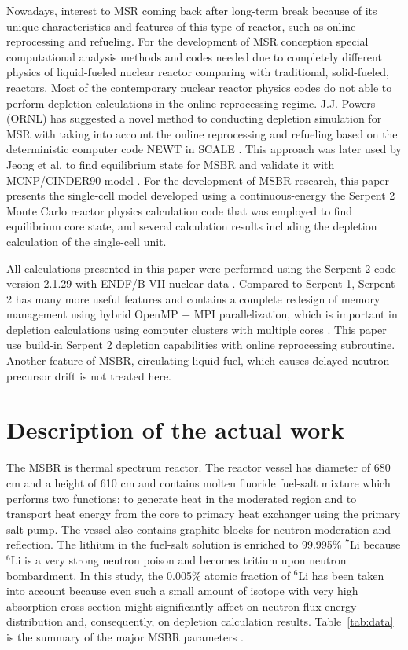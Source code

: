 \documentclass{anstrans}
\begin{document}
Nowadays, interest to \gls{MSR} coming back after long-term break because of its unique characteristics and features of this type of reactor, such as online reprocessing and refueling. For the development of \gls{MSR} conception special computational analysis methods and codes needed due to completely different physics of liquid-fueled nuclear reactor comparing with traditional, solid-fueled, reactors. Most of the contemporary nuclear reactor physics codes do not able to perform depletion calculations in the online reprocessing regime. J.J. Powers (\gls{ORNL}) has suggested a novel method to conducting depletion simulation for \gls{MSR} with taking into account the online reprocessing and refueling based on the deterministic computer code NEWT in SCALE \cite{powers_new_2013}. This approach was later used by Jeong et al. to find equilibrium state for \gls{MSBR} and validate it with \gls{MCNP}/CINDER90 model \cite{jeong_equilibrium_2016}. For the development of \gls{MSBR} research, this paper presents the single-cell model developed using a continuous-energy the Serpent 2 Monte Carlo reactor physics calculation code that was employed to find equilibrium core state, and several calculation results including the depletion calculation of the single-cell unit.

All calculations presented in this paper were performed using the Serpent 2 code version 2.1.29 with ENDF/B-VII
nuclear data \cite{leppanen_serpent_2012,chadwick_endf/b-vii.0:_2006}. Compared to Serpent 1, Serpent 2 has many more useful features and contains a complete redesign of memory management using hybrid OpenMP + MPI parallelization, which is important in depletion calculations using computer clusters with multiple cores \cite{leppanen_serpent_2015}. This paper use build-in Serpent 2 depletion capabilities with online reprocessing subroutine. Another feature of \gls{MSBR}, circulating
liquid fuel, which causes delayed neutron precursor drift is not treated here.

\section{Description of the actual work}
The \gls{MSBR} is thermal spectrum reactor. The reactor vessel has diameter of 680 cm and a height of 610 cm and contains molten fluoride fuel-salt mixture which performs two functions: to generate heat in the moderated region and to transport heat energy from the core to primary heat exchanger using the primary salt pump. The vessel also contains graphite blocks for neutron moderation and reflection. The lithium in the fuel-salt solution is enriched to 99.995\% $^7$Li because $^6$Li is a very strong neutron poison and becomes tritium upon neutron bombardment. In this study, the 0.005\% atomic fraction of $^6$Li has been taken into account because even such a small amount of isotope with very high absorption cross section might significantly affect on neutron flux energy distribution and, consequently, on depletion calculation results. Table~\ref{tab:data} is the summary of the major \gls{MSBR} parameters \cite{robertson_conceptual_1971}. 
\end{document}

